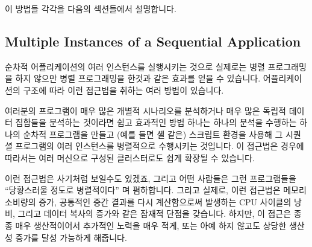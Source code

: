 이 방법들 각각을 다음의 섹션들에서 설명합니다.

\subsection{Multiple Instances of a Sequential Application}
\label{sec:intro:Multiple Instances of a Sequential Application}

순차적 어플리케이션의 여러 인스턴스를 실행시키는 것으로 실제로는 병렬
프로그래밍을 하지 않으만 병렬 프로그래밍을 한것과 같은 효과를 얻을 수 있습니다.
어플리케이션의 구조에 따라 이런 접근법을 취하는 여러 방법이 있습니다.

여러분의 프로그램이 매우 많은 개별적 시나리오를 분석하거나 매우 많은 독립적
데이터 집합들을 분석하는 것이라면 쉽고 효과적인 방법 하나는 하나의 분석을
수행하는 하나의 순차적 프로그램을 만들고 (예를 들면  셸 같은) 스크립트
환경을 사용해 그 시퀀셜 프로그램의 여러 인스턴스를 병렬적으로 수행시키는
것입니다.
이 접근법은 경우에 따라서는 여러 머신으로 구성된 클러스터로도 쉽게 확장될 수
있습니다.

이런 접근법은 사기처럼 보일수도 있겠죠, 그리고 어떤 사람들은 그런 프로그램들을
``당황스러울 정도로 병렬적이다'' 며 폄하합니다.
그리고 실제로, 이런 접근법은 메모리 소비량의 증가, 공통적인 중간 결과를 다시
계산함으로써 발생하는 CPU 사이클의 낭비, 그리고 데이터 복사의 증가와 같은
잠재적 단점을 갖습니다.
하지만, 이 접근은 종종 매우 생산적이어서 추가적인 노력을 매우 적게, 또는 아예
하지 않고도 상당한 생산성 증가를 달성 가능하게 해줍니다.

